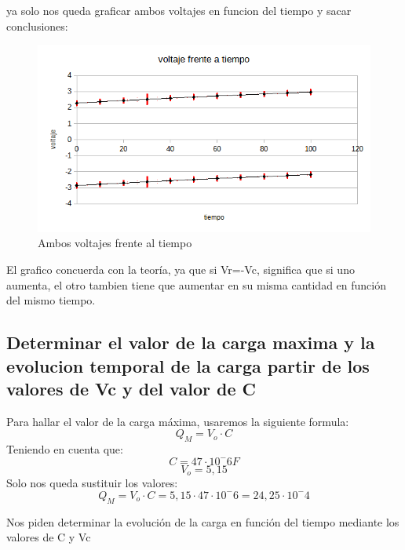 \documentclass{article}
\begin{document}
ya solo nos queda graficar ambos voltajes en funcion del tiempo y sacar conclusiones:

\begin{figure}[H]
    \centering
    \includegraphics[width=1\linewidth]{image.png}
    \caption{Ambos voltajes frente al tiempo}
    \label{fig:enter-label}
\end{figure}


El grafico concuerda con la teoría, ya que si Vr=-Vc, significa que si uno aumenta, el otro tambien tiene que aumentar en su misma cantidad en función del mismo tiempo.
\newpage
\subsection{Determinar el valor de la carga maxima y la evolucion temporal de la carga partir de los valores de Vc y del valor de C}

Para hallar el valor de la carga máxima, usaremos la siguiente formula:
\begin{equation}
Q_M = V_o \cdot C
\end{equation}
Teniendo en cuenta que:
\begin{equation}
C=47\cdot10^-6 F
\end{equation}
\begin{equation}
V_o=5,15
\end{equation}
Solo nos queda sustituir los valores:
\begin{equation}
Q_M = V_o \cdot C=5,15\cdot47\cdot10^-6=24,25\cdot10^-4
\end{equation}

Nos piden determinar la evolución de la carga en función del tiempo mediante los valores de C y Vc
\end{document}
